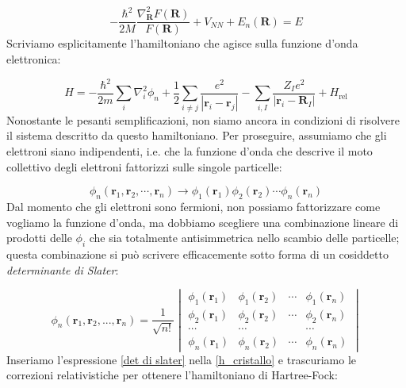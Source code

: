 \documentclass[a4paper]{report}
\begin{document}
\begin{equation}
    -\frac{\hbar^2}{2M}\frac{\nabla^2_{\mathbf{R}}F(\mathbf{R})}{F(\mathbf{R})} + V_{NN} + E_n(\mathbf{R}) = E
\end{equation}
Scriviamo esplicitamente l'hamiltoniano che agisce sulla funzione d'onda elettronica:

\begin{equation}
    H = -\frac{\hbar^2}{2m}\sum_i\nabla^2_i\phi_n + \frac{1}{2}\sum_{i\neq j} \frac{e^2}{|\mathbf{r}_i-\mathbf{r}_j|} - \sum_{i, I} \frac{Z_I e^2}{|\mathbf{r}_i-\mathbf{R}_I|} + H_{\text{
    rel}}
    \label{h_cristallo}
\end{equation}
Nonostante le pesanti semplificazioni, non siamo ancora in condizioni di risolvere il sistema descritto da questo hamiltoniano. Per proseguire, assumiamo che gli elettroni siano indipendenti, i.e. che la funzione d'onda che descrive il moto collettivo degli elettroni fattorizzi sulle singole particelle:

\begin{equation}
    \phi_n(\mathbf{r}_1,\mathbf{r}_2,\cdots ,\mathbf{r}_n) \to \phi_1(\mathbf{r}_1)\phi_2(\mathbf{r}_2)\cdots \phi_n(\mathbf{r}_n)
\end{equation}
Dal momento che gli elettroni sono fermioni, non possiamo fattorizzare come vogliamo la funzione d'onda, ma dobbiamo scegliere una combinazione lineare di prodotti delle $\phi_i$ che sia totalmente antisimmetrica nello scambio delle particelle; questa combinazione si può scrivere efficacemente sotto forma di un cosiddetto \textit{determinante di Slater}:

\begin{equation}
    \phi_n(\mathbf{r}_1,\mathbf{r}_2,...,\mathbf{r}_n) = \frac{1}{\sqrt{n!}}
\begin{vmatrix}
\phi_1(\mathbf{r}_1) & \phi_1(\mathbf{r}_2)  & \cdots & \phi_1(\mathbf{r}_n) \\ 
\phi_2(\mathbf{r}_1) & \phi_2(\mathbf{r}_2) & \cdots  & \phi_2(\mathbf{r}_n) \\
\cdots  &\cdots  &  & \cdots  \\ 
\phi_n(\mathbf{r}_1)  &\phi_n(\mathbf{r}_2) &  \cdots  & \phi_n(\mathbf{r}_n) 
\end{vmatrix}
\label{det di slater}
\end{equation}
Inseriamo l'espressione \eqref{det di slater} nella \eqref{h_cristallo} e trascuriamo le correzioni relativistiche per ottenere l'hamiltoniano di Hartree-Fock:
\end{document}

